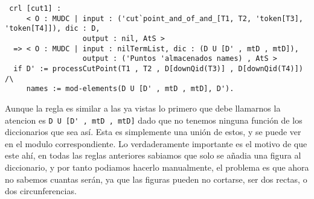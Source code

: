 {\codesize
\begin{verbatim}
 crl [cut1] :
     < O : MUDC | input : ('cut`point_and_of_and_[T1, T2, 'token[T3], 'token[T4]]), dic : D,
                  output : nil, AtS >
  => < O : MUDC | input : nilTermList, dic : (D U [D' , mtD , mtD]),
                  output : ('Puntos 'almacenados names) , AtS >
  if D' := processCutPoint(T1 , T2 , D[downQid(T3)] , D[downQid(T4)]) /\
     names := mod-elements(D U [D' , mtD , mtD], D').
\end{verbatim}
}

Aunque la regla es similar a las ya vistas lo primero que debe llamarnos la atencion es \verb"D U [D' , mtD , mtD]" dado que no tenemos ninguna función de los diccionarios que sea así. Esta es simplemente una unión de estos, y se puede ver en el modulo correspondiente. Lo verdaderamente importante es el motivo de que este ahí, en todas las reglas anteriores sabiamos que solo se añadia una figura al diccionario, y por tanto podiamos hacerlo manualmente, el problema es que ahora no sabemos cuantas serán, ya que las figuras pueden no cortarse, ser dos rectas, o dos circunferencias. 

